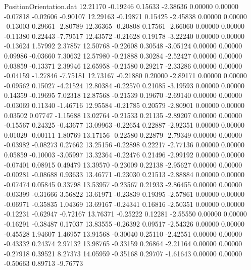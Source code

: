 \begin{filecontents}{PositionOrientation.dat}
  12.21170   -0.19246    0.15633    -2.38636    0.00000    0.00000   -0.07818   -0.02606   -0.90107
  12.29163   -0.19871    0.15425    -2.45838    0.00000    0.00000   -0.13003    0.29661   -2.80789
  12.36365   -0.20808    0.17561    -2.66060    0.00000    0.00000   -0.11380    0.22443   -7.79517
  12.43572   -0.21628    0.19178    -3.22240    0.00000    0.00000   -0.13624    1.57992    2.37857
  12.50768   -0.22608    0.30548    -3.05124    0.00000    0.00000    0.09986   -0.03660    7.30632
  12.57980   -0.21888    0.30284    -2.52427    0.00000    0.00000    0.03859   -0.13371    2.39946
  12.65958   -0.21580    0.29217    -2.33286    0.00000    0.00000   -0.04159   -1.27846   -7.75181
  12.73167   -0.21880    0.20000    -2.89171    0.00000    0.00000   -0.09562    0.15027   -4.21524
  12.80384   -0.22570    0.21085    -3.19593    0.00000    0.00000    0.14359   -0.19695    7.02318
  12.87568   -0.21539    0.19670    -2.69140    0.00000    0.00000   -0.03069    0.11340   -1.46716
  12.95584   -0.21785    0.20579    -2.80901    0.00000    0.00000    0.03502    0.07747   -1.15688
  13.02764   -0.21533    0.21135    -2.89207    0.00000    0.00000   -0.15567    0.24325   -0.43677
  13.09963   -0.22654    0.22887    -2.92351    0.00000    0.00000    0.01029   -0.00111    1.80769
  13.17156   -0.22580    0.22879    -2.79349    0.00000    0.00000   -0.03982   -0.08273    0.27662
  13.25156   -0.22898    0.22217    -2.77136    0.00000    0.00000    0.05859   -0.10003   -3.05997
  13.32364   -0.22476    0.21496    -2.99192    0.00000    0.00000   -0.07401    0.08915    0.49479
  13.39570   -0.23009    0.22138    -2.95627    0.00000    0.00000   -0.00281   -0.08688    0.93633
  13.46771   -0.23030    0.21513    -2.88884    0.00000    0.00000   -0.07474    0.05845    0.33798
  13.53957   -0.23567    0.21933    -2.86455    0.00000    0.00000   -0.03399   -0.31666    3.56822
  13.61971   -0.23839    0.19395    -2.57861    0.00000    0.00000   -0.06971   -0.35835    1.04369
  13.69167   -0.24341    0.16816    -2.50351    0.00000    0.00000   -0.12231   -0.62947   -0.72167
  13.76371   -0.25222    0.12281    -2.55550    0.00000    0.00000   -0.16291   -0.38487    0.17037
  13.83555   -0.26392    0.09517    -2.54326    0.00000    0.00000   -0.45528    1.94607    1.46957
  13.91568   -0.30040    0.25110    -2.42551    0.00000    0.00000   -0.43332    0.24374    2.97132
  13.98765   -0.33159    0.26864    -2.21164    0.00000    0.00000   -0.27918    0.39521    8.27373
  14.05959   -0.35168    0.29707    -1.61643    0.00000    0.00000   -0.50663    0.89713   -9.76773

\end{filecontents}
